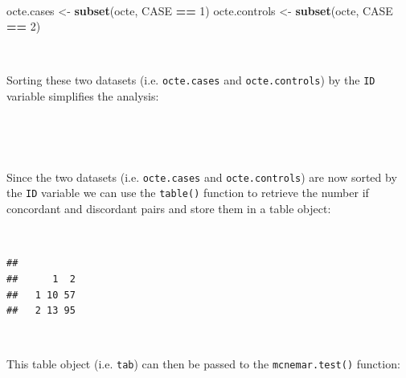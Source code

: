 \documentclass[12pt,a4paper]{book}
\newenvironment{Shaded}{\begin{snugshade}}{\end{snugshade}}
\newcommand{\KeywordTok}[1]{\textcolor[rgb]{0.13,0.29,0.53}{\textbf{#1}}}
\newcommand{\DecValTok}[1]{\textcolor[rgb]{0.00,0.00,0.81}{#1}}
\newcommand{\StringTok}[1]{\textcolor[rgb]{0.31,0.60,0.02}{#1}}
\newcommand{\OperatorTok}[1]{\textcolor[rgb]{0.81,0.36,0.00}{\textbf{#1}}}
\newcommand{\NormalTok}[1]{#1}
\theoremstyle{definition}
\theoremstyle{definition}
\theoremstyle{definition}
\theoremstyle{remark}
\begin{document}
~

\begin{Shaded}
\begin{Highlighting}[]
\NormalTok{octe.cases <-}\StringTok{ }\KeywordTok{subset}\NormalTok{(octe, CASE }\OperatorTok{==}\StringTok{ }\DecValTok{1}\NormalTok{)}
\NormalTok{octe.controls <-}\StringTok{ }\KeywordTok{subset}\NormalTok{(octe, CASE }\OperatorTok{==}\StringTok{ }\DecValTok{2}\NormalTok{)}
\end{Highlighting}
\end{Shaded}

~

Sorting these two datasets (i.e. \texttt{octe.cases} and
\texttt{octe.controls}) by the \texttt{ID} variable simplifies the
analysis:

~

\begin{Shaded}
\end{Shaded}

~

Since the two datasets (i.e. \texttt{octe.cases} and
\texttt{octe.controls}) are now sorted by the \texttt{ID} variable we
can use the \texttt{table()} function to retrieve the number if
concordant and discordant pairs and store them in a table object:

~

\begin{Shaded}
\end{Shaded}

\begin{verbatim}
##    
##      1  2
##   1 10 57
##   2 13 95
\end{verbatim}

~

This table object (i.e. \texttt{tab}) can then be passed to the
\texttt{mcnemar.test()} function:

~
\end{document}
